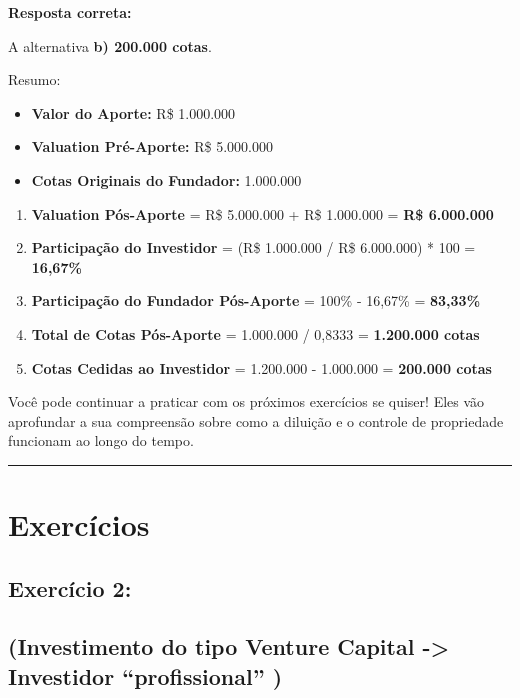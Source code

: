 \documentclass[
]{book}
\begin{document}
\textbf{Resposta correta:}

A alternativa \textbf{b) 200.000 cotas}.

Resumo:

\begin{itemize}
\item
  \textbf{Valor do Aporte:} R\$ 1.000.000
\item
  \textbf{Valuation Pré-Aporte:} R\$ 5.000.000
\item
  \textbf{Cotas Originais do Fundador:} 1.000.000
\end{itemize}

\begin{enumerate}
\def\labelenumi{\arabic{enumi}.}
\item
  \textbf{Valuation Pós-Aporte} = R\$ 5.000.000 + R\$ 1.000.000 = \textbf{R\$ 6.000.000}
\item
  \textbf{Participação do Investidor} = (R\$ 1.000.000 / R\$ 6.000.000) * 100 = \textbf{16,67\%}
\item
  \textbf{Participação do Fundador Pós-Aporte} = 100\% - 16,67\% = \textbf{83,33\%}
\item
  \textbf{Total de Cotas Pós-Aporte} = 1.000.000 / 0,8333 = \textbf{1.200.000 cotas}
\item
  \textbf{Cotas Cedidas ao Investidor} = 1.200.000 - 1.000.000 = \textbf{200.000 cotas}
\end{enumerate}

Você pode continuar a praticar com os próximos exercícios se quiser! Eles vão aprofundar a sua compreensão sobre como a diluição e o controle de propriedade funcionam ao longo do tempo.

\begin{center}\rule{0.5\linewidth}{0.5pt}\end{center}

\section{Exercícios}\label{exercuxedcios-1}

\subsection{\texorpdfstring{\textbf{Exercício 2:}}{Exercício 2:}}\label{exercuxedcio-2}

\subsection{(Investimento do tipo Venture Capital -\textgreater{} Investidor ``profissional'' )}\label{investimento-do-tipo-venture-capital---investidor-profissional}
\end{document}
